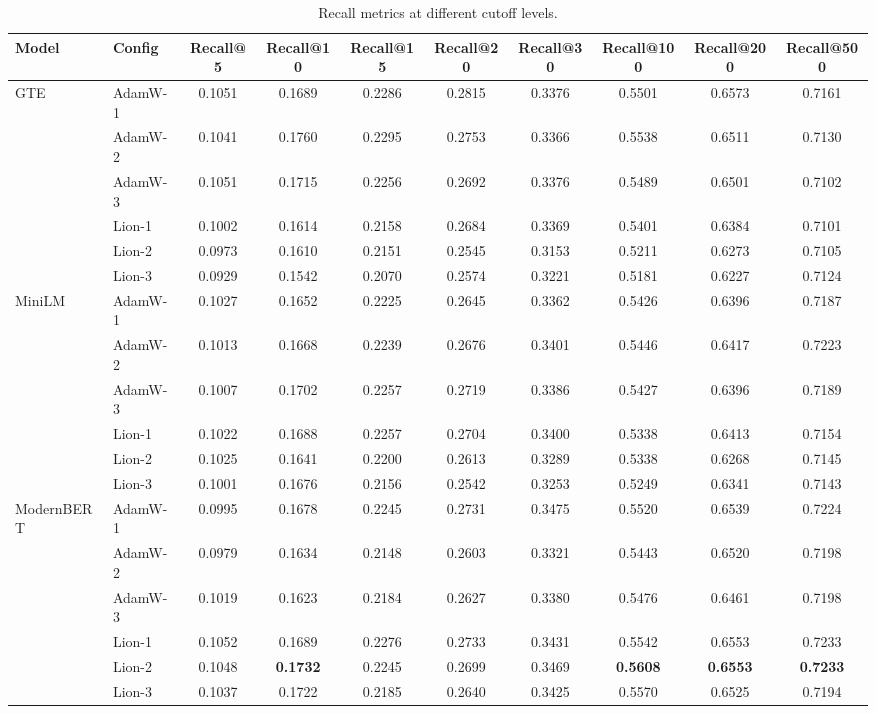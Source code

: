 \documentclass[conference]{IEEEtran}
\begin{document}
\begin{table}[t]
\centering
\caption{Recall metrics at different cutoff levels.}
\label{tab:recall_metrics}
\small
\begin{tabular}{llcccccccc}
\toprule
\textbf{Model} & \textbf{Config} & \textbf{Recall@5} & \textbf{Recall@10} & \textbf{Recall@15} & \textbf{Recall@20} & \textbf{Recall@30} & \textbf{Recall@100} & \textbf{Recall@200} & \textbf{Recall@500} \\
\midrule
\multirow{6}{*}{GTE} & AdamW-1 & 0.1051 & 0.1689 & 0.2286 & 0.2815 & 0.3376 & 0.5501 & 0.6573 & 0.7161 \\
 & AdamW-2 & 0.1041 & 0.1760 & 0.2295 & 0.2753 & 0.3366 & 0.5538 & 0.6511 & 0.7130 \\
 & AdamW-3 & 0.1051 & 0.1715 & 0.2256 & 0.2692 & 0.3376 & 0.5489 & 0.6501 & 0.7102 \\
 & Lion-1 & 0.1002 & 0.1614 & 0.2158 & 0.2684 & 0.3369 & 0.5401 & 0.6384 & 0.7101 \\
 & Lion-2 & 0.0973 & 0.1610 & 0.2151 & 0.2545 & 0.3153 & 0.5211 & 0.6273 & 0.7105 \\
 & Lion-3 & 0.0929 & 0.1542 & 0.2070 & 0.2574 & 0.3221 & 0.5181 & 0.6227 & 0.7124 \\
\midrule
\multirow{6}{*}{MiniLM} & AdamW-1 & 0.1027 & 0.1652 & 0.2225 & 0.2645 & 0.3362 & 0.5426 & 0.6396 & 0.7187 \\
 & AdamW-2 & 0.1013 & 0.1668 & 0.2239 & 0.2676 & 0.3401 & 0.5446 & 0.6417 & 0.7223 \\
 & AdamW-3 & 0.1007 & 0.1702 & 0.2257 & 0.2719 & 0.3386 & 0.5427 & 0.6396 & 0.7189 \\
 & Lion-1 & 0.1022 & 0.1688 & 0.2257 & 0.2704 & 0.3400 & 0.5338 & 0.6413 & 0.7154 \\
 & Lion-2 & 0.1025 & 0.1641 & 0.2200 & 0.2613 & 0.3289 & 0.5338 & 0.6268 & 0.7145 \\
 & Lion-3 & 0.1001 & 0.1676 & 0.2156 & 0.2542 & 0.3253 & 0.5249 & 0.6341 & 0.7143 \\
\midrule
\multirow{6}{*}{ModernBERT} & AdamW-1 & 0.0995 & 0.1678 & 0.2245 & 0.2731 & 0.3475 & 0.5520 & 0.6539 & 0.7224 \\
 & AdamW-2 & 0.0979 & 0.1634 & 0.2148 & 0.2603 & 0.3321 & 0.5443 & 0.6520 & 0.7198 \\
 & AdamW-3 & 0.1019 & 0.1623 & 0.2184 & 0.2627 & 0.3380 & 0.5476 & 0.6461 & 0.7198 \\
 & Lion-1 & 0.1052 & 0.1689 & 0.2276 & 0.2733 & 0.3431 & 0.5542 & 0.6553 & 0.7233 \\
 & Lion-2 & 0.1048 & \textbf{0.1732} & 0.2245 & 0.2699 & 0.3469 & \textbf{0.5608} & \textbf{0.6553} & \textbf{0.7233} \\
 & Lion-3 & 0.1037 & 0.1722 & 0.2185 & 0.2640 & 0.3425 & 0.5570 & 0.6525 & 0.7194 \\
\bottomrule
\end{tabular}
\end{table}
\end{document}
